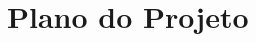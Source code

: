\documentclass{article}
\begin{document}


\section*{Plano do Projeto}
\label{sec:plan}

\end{document}
